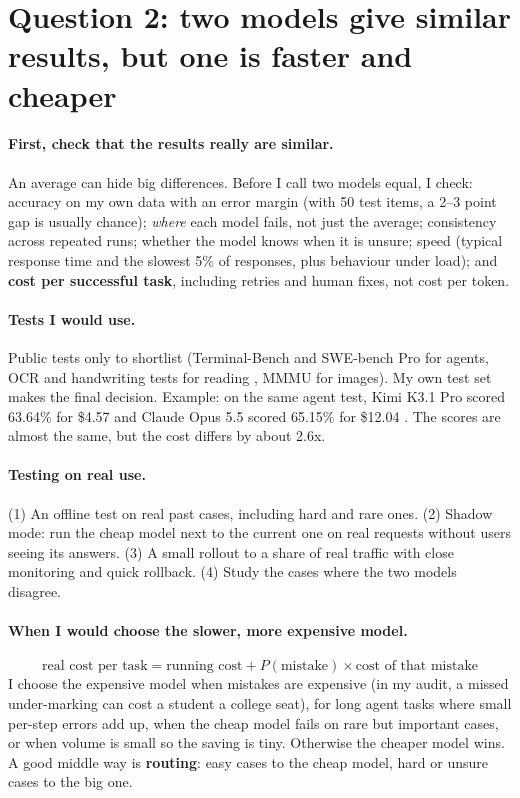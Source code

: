 \section{Question 2: two models give similar results, but one is faster and cheaper}

\paragraph{First, check that the results really are similar.} An average can hide big differences. Before I call two
models equal, I check: accuracy on my own data with an error margin (with 50 test items, a 2--3 point gap is usually
chance); \emph{where} each model fails, not just the average; consistency across repeated runs; whether the model knows
when it is unsure; speed (typical response time and the slowest 5\% of responses, plus behaviour under load); and
\textbf{cost per successful task}, including retries and human fixes, not cost per token.

\paragraph{Tests I would use.} Public tests only to shortlist (Terminal-Bench and SWE-bench Pro for agents, OCR and
handwriting tests for reading \citep{wildhandbench2026,omnihand2026}, MMMU for images). My own test set makes the final
decision. Example: on the same agent test, Kimi K3.1 Pro scored 63.64\% for \$4.57 and Claude Opus 5.5 scored 65.15\% for
\$12.04 \citep{valstb4}. The scores are almost the same, but the cost differs by about 2.6x.

\paragraph{Testing on real use.} (1) An offline test on real past cases, including hard and rare ones. (2) Shadow mode:
run the cheap model next to the current one on real requests without users seeing its answers. (3) A small rollout to
a share of real traffic with close monitoring and quick rollback. (4) Study the cases where the two models disagree.

\paragraph{When I would choose the slower, more expensive model.}
\[
\text{real cost per task} = \text{running cost} + P(\text{mistake}) \times \text{cost of that mistake}
\]
I choose the expensive model when mistakes are expensive (in my audit, a missed under-marking can cost a student a college
seat), for long agent tasks where small per-step errors add up, when the cheap model fails on rare but important cases,
or when volume is small so the saving is tiny. Otherwise the cheaper model wins. A good middle way is \textbf{routing}:
easy cases to the cheap model, hard or unsure cases to the big one.

